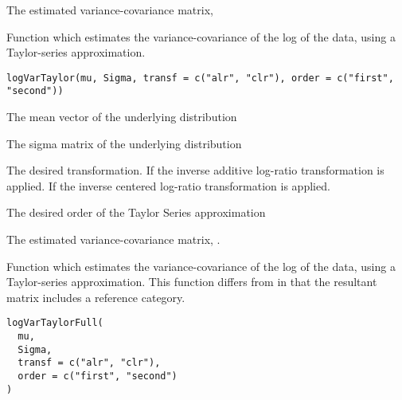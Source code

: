 \documentclass[a4paper]{book}
\begin{document}
%
\begin{Value}
The estimated variance-covariance matrix, 
\end{Value}
%
\begin{Description}\relax
Function which estimates the variance-covariance of the log of the data, using a 
Taylor-series approximation.
\end{Description}
%
\begin{Usage}
\begin{verbatim}
logVarTaylor(mu, Sigma, transf = c("alr", "clr"), order = c("first", "second"))
\end{verbatim}
\end{Usage}
%
\begin{Arguments}
\begin{ldescription}
\item[\code{mu}] The mean vector of the underlying distribution

\item[\code{Sigma}] The sigma matrix of the underlying distribution

\item[\code{transf}] The desired transformation. If  the inverse 
additive log-ratio transformation is applied. If  the
inverse centered log-ratio transformation is applied.

\item[\code{order}] The desired order of the Taylor Series approximation
\end{ldescription}
\end{Arguments}
%
\begin{Value}
The estimated variance-covariance matrix, .
\end{Value}
%
\begin{Description}\relax
Function which estimates the variance-covariance of the log of the data, using a 
Taylor-series approximation. This function differs from  in
that the resultant matrix includes a reference category.
\end{Description}
%
\begin{Usage}
\begin{verbatim}
logVarTaylorFull(
  mu,
  Sigma,
  transf = c("alr", "clr"),
  order = c("first", "second")
)
\end{verbatim}
\end{Usage}
\end{document}
